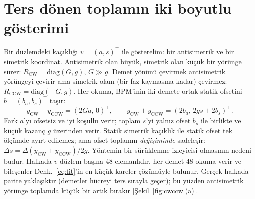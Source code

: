 \documentclass[12pt,a4paper]{extarticle}
\begin{document}
\section{Ters dönen toplamın iki boyutlu gösterimi}\label{ek:oyuncak}
Bir düzlemdeki kaçıklığı $v=(a,s)^\top$ ile gösterelim: bir antisimetrik ve bir simetrik koordinat. Antisimetrik
olan büyük, simetrik olan küçük bir yörünge sürer: $R_\text{CW}=\mathrm{diag}(G,g)$, $G\gg g$. Demet yönünü
çevirmek antisimetrik yörüngeyi çevirir ama simetrik olanı (bir faz kaymasına kadar) çevirmez:
$R_\text{CCW}=\mathrm{diag}(-G,g)$. Her okuma, BPM'inin iki demete ortak statik ofsetini $b=(b_a,b_s)^\top$ taşır:
\begin{equation}
y_\text{CW}-y_\text{CCW}=(2Ga,\,0)^\top,\qquad y_\text{CW}+y_\text{CCW}=(2b_a,\,2gs+2b_s)^\top.
\end{equation}
Fark $a$'yı ofsetsiz ve iyi koşullu verir; toplam $s$'yi yalnız ofset $b_s$ ile birlikte ve küçük kazanç $g$
üzerinden verir. Statik simetrik kaçıklık ile statik ofset tek ölçümde ayırt edilemez; ama ofset toplamın
\emph{değişiminde} sadeleşir: $\Delta s=\Delta(y_\text{CW}+y_\text{CCW})/2g$. Yöntemin bir sürüklenme izleyicisi
olmasının nedeni budur. Halkada $v$ düzlem başına 48 elemanlıdır, her demet 48 okuma verir ve bileşenler
Denk.~\eqref{eq:fit}'in en küçük kareler çözümüyle bulunur. Gerçek halkada parite yaklaşıktır (demetler hücreyi
ters sırayla geçer); bu yüzden antisimetrik yörünge toplamda küçük bir artık bırakır [Şekil~\ref{fig:cwccw}(a)].
\end{document}
